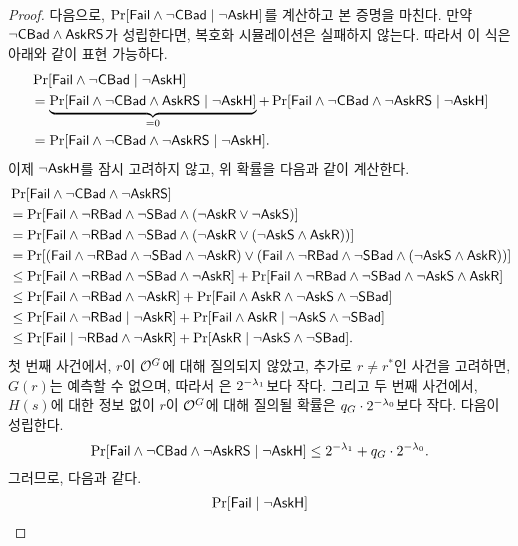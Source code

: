 \documentclass{article}
\theoremstyle{definition}
\begin{document}
\begin{proof}
	다음으로, $\Pr[\Fail \land \neg\Cbad \mid \neg\askH]$를 계산하고 본 증명을
	마친다. 만약 $\neg \Cbad \wedge \askRS$가 성립한다면, 복호화
	시뮬레이션은 실패하지 않는다. 따라서 이 식은 아래와 같이 표현
	가능하다.
	\begin{align*}
		&\Pr[\Fail \land \neg\Cbad \mid \neg \askH] \\
		&= \underbrace{\Pr[\Fail \land \neg \Cbad \land \askRS \mid \neg \askH]}_{= 0}
		+ \Pr[\Fail \land \neg \Cbad \land \neg \askRS \mid \neg \askH] \\
		&= \Pr[\Fail \land \neg \Cbad \land \neg \askRS \mid \neg \askH].
	\end{align*}
	이제 $\neg \askH$를 잠시 고려하지 않고, 위 확률을 다음과 같이 계산한다.
	\begin{align*}
		&\Pr[\Fail \land \neg\Cbad \land \neg\askRS] \\
		&= \Pr[\Fail \land \neg\Rbad \land \neg\Sbad \land (\neg\askR \lor \neg\askS)] \\
		&= \Pr[\Fail \land \neg\Rbad \land \neg\Sbad \land (\neg\askR \lor (\neg\askS \land \askR))] \\
		&= \Pr[(\Fail \land \neg\Rbad \land \neg\Sbad \land \neg\askR) \lor
		(\Fail \land \neg\Rbad \land \neg\Sbad \land (\neg\askS \land \askR))] \\
		&\le \Pr[\Fail \land \neg\Rbad \land \neg\Sbad \land \neg\askR]+
		\Pr[\Fail \land \neg\Rbad \land \neg\Sbad \land \neg\askS \land \askR] \\
		&\le \Pr[\Fail \land \neg\Rbad \land \neg\askR]+
		\Pr[\Fail \land \askR \land \neg\askS \land \neg\Sbad] \\
		&\le \Pr[\Fail \land \neg\Rbad \mid \neg\askR]+
		\Pr[\Fail \land \askR \mid \neg\askS \land \neg\Sbad] \\
		&\le \Pr[\Fail \mid \neg\Rbad \land \neg\askR] +
		\Pr[\askR \mid \neg\askS \land \neg\Sbad].
	\end{align*}
	첫 번째 사건에서, $r$이 $\orc^{\gash}$에 대해 질의되지 않았고, 추가로 $r \ne
	r^*$인 사건을 고려하면, $G(r)$는 예측할 수 없으며, 따라서 은 $2^{-\sp_1}$보다 작다. 그리고 두 번째
	사건에서, $H(s)$에 대한 정보 없이 $r$이 $\orc^{\gash}$에 대해 질의될 확률은 $q_G \cdot
	2^{-\sp_0}$보다 작다.  다음이
	성립한다.
	$$
		\Pr[\Fail \wedge \neg \Cbad \wedge \neg \askRS \mid \neg \askH] 
		\leq 2^{-\sp_1} + q_G \cdot 2^{-\sp_0}.
	$$	
	그러므로, 다음과 같다.
	\begin{align*}
		\Pr[\Fail \mid \neg\askH]

\end{align*}
\end{proof}
\end{document}
